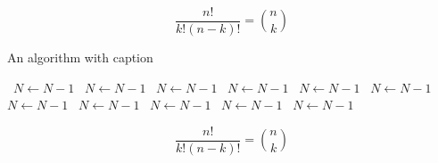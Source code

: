 \documentclass[a4paper]{article}
\begin{document}
\[ \frac{n!}{k!(n-k)!} = \binom{n}{k} \]

\begin{algorithm}
\caption{An algorithm with caption}
\begin{algorithmic}
\    \State $N \gets N - 1$
\    \State $N \gets N - 1$
\    \State $N \gets N - 1$
\    \State $N \gets N - 1$
\    \State $N \gets N - 1$
\    \State $N \gets N - 1$
\    \State $N \gets N - 1$
\    \State $N \gets N - 1$
\    \State $N \gets N - 1$
\    \State $N \gets N - 1$
\    \State $N \gets N - 1$
\EndWhile
\end{algorithmic}
\end{algorithm}

\[ \frac{n!}{k!(n-k)!} = \binom{n}{k} \]
\end{document}

